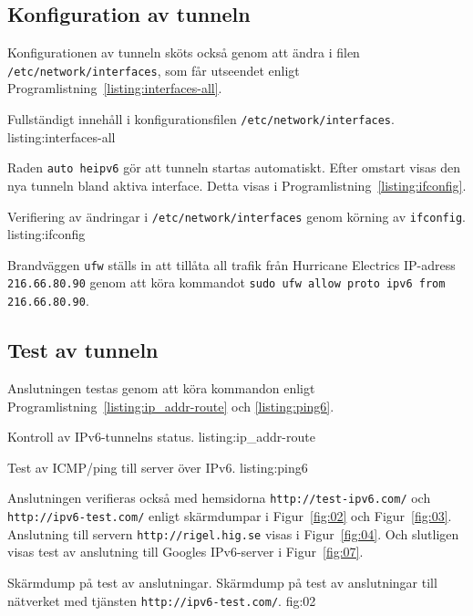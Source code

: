 \subsection{Konfiguration av tunneln}
Konfigurationen av tunneln sköts också genom att ändra i filen
\texttt{/etc/network/interfaces}, som får utseendet enligt
Programlistning~\ref{listing:interfaces-all}.

						 {Fullständigt innehåll i konfigurationsfilen
							\texttt{/etc/network/interfaces}.}
             {listing:interfaces-all}


Raden \texttt{auto heipv6} gör att tunneln startas automatiskt.
Efter omstart visas den nya tunneln bland aktiva interface. Detta visas i  
Programlistning~\ref{listing:ifconfig}.

            {Verifiering av ändringar i \texttt{/etc/network/interfaces}
             genom körning av \texttt{ifconfig}.}
            {listing:ifconfig}

Brandväggen \texttt{ufw} ställs in att tillåta all trafik från Hurricane
Electrics IP-adress \texttt{216.66.80.90} genom att köra kommandot 
\texttt{sudo ufw allow proto ipv6 from 216.66.80.90}.

\subsection{Test av tunneln}
Anslutningen testas genom att köra kommandon enligt 
Programlistning~\ref{listing:ip_addr-route} och \ref{listing:ping6}.

            {Kontroll av IPv6-tunnelns status.}
            {listing:ip_addr-route}

            {Test av ICMP/ping till server över IPv6.}
            {listing:ping6}

Anslutningen verifieras också med hemsidorna \texttt{http://test-ipv6.com/} och
\texttt{http://ipv6-test.com/} enligt skärmdumpar i Figur~\ref{fig:02} och
Figur~\ref{fig:03}.
Anslutning till servern \texttt{http://rigel.hig.se} visas i
Figur~\ref{fig:04}.
Och slutligen visas test av anslutning till Googles IPv6-server i
Figur~\ref{fig:07}.


           {Skärmdump på test av anslutningar.}
					 {Skärmdump på test av anslutningar till nätverket med tjänsten
						\texttt{http://ipv6-test.com/}.}
           {fig:02}

